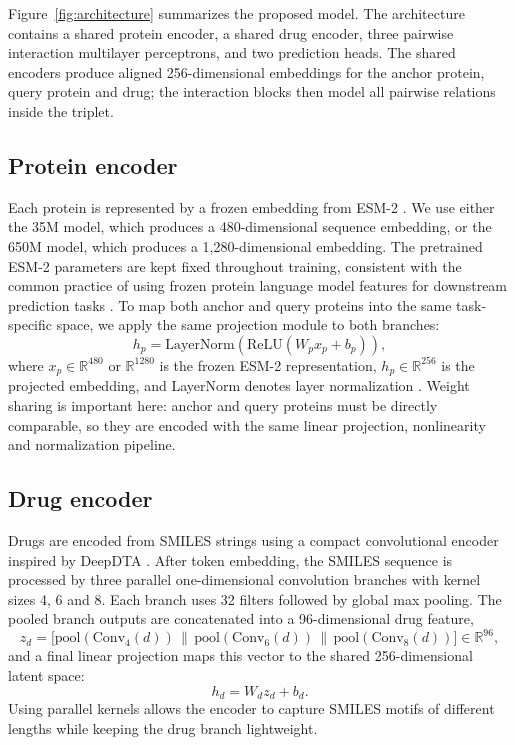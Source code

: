 Figure~\ref{fig:architecture} summarizes the proposed model. The architecture contains a shared protein encoder, a shared drug encoder, three pairwise interaction multilayer perceptrons, and two prediction heads. The shared encoders produce aligned 256-dimensional embeddings for the anchor protein, query protein and drug; the interaction blocks then model all pairwise relations inside the triplet.

\subsection{Protein encoder}

Each protein is represented by a frozen embedding from ESM-2 \cite{lin2023esm2}. We use either the 35M model, which produces a 480-dimensional sequence embedding, or the 650M model, which produces a 1,280-dimensional embedding. The pretrained ESM-2 parameters are kept fixed throughout training, consistent with the common practice of using frozen protein language model features for downstream prediction tasks \cite{rives2021biological,rao2019evaluating}. To map both anchor and query proteins into the same task-specific space, we apply the same projection module to both branches:
\[
h_p = \mathrm{LayerNorm}\!\left(\mathrm{ReLU}(W_p x_p + b_p)\right),
\]
where $x_p\in\mathbb{R}^{480}$ or $\mathbb{R}^{1280}$ is the frozen ESM-2 representation, $h_p\in\mathbb{R}^{256}$ is the projected embedding, and LayerNorm denotes layer normalization \cite{ba2016layernorm}. Weight sharing is important here: anchor and query proteins must be directly comparable, so they are encoded with the same linear projection, nonlinearity and normalization pipeline.

\subsection{Drug encoder}

Drugs are encoded from SMILES strings \cite{weininger1988smiles} using a compact convolutional encoder inspired by DeepDTA \cite{ozturk2018deepdta}. After token embedding, the SMILES sequence is processed by three parallel one-dimensional convolution branches with kernel sizes 4, 6 and 8. Each branch uses 32 filters followed by global max pooling. The pooled branch outputs are concatenated into a 96-dimensional drug feature,
\[
z_d = \big[\mathrm{pool}(\mathrm{Conv}_4(d)) \,\|\, \mathrm{pool}(\mathrm{Conv}_6(d)) \,\|\, \mathrm{pool}(\mathrm{Conv}_8(d))\big]\in\mathbb{R}^{96},
\]
and a final linear projection maps this vector to the shared 256-dimensional latent space:
\[
h_d = W_d z_d + b_d.
\]
Using parallel kernels allows the encoder to capture SMILES motifs of different lengths while keeping the drug branch lightweight.

